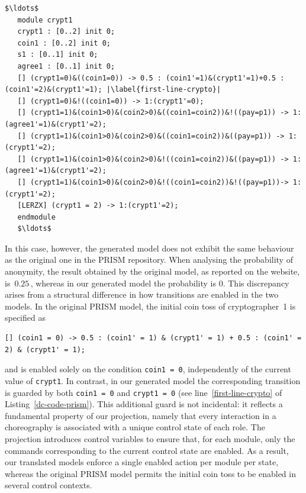 \begin{lstlisting}[style=prism-color,caption={Part of the generated PRISM model for the Dining Cryptographers Protocol},captionpos=b,label={dc-code-prism},escapechar=|]
   $\ldots$
   module crypt1
   crypt1 : [0..2] init 0;
   coin1 : [0..2] init 0;
   s1 : [0..1] init 0;
   agree1 : [0..1] init 0;
   [] (crypt1=0)&((coin1=0)) -> 0.5 : (coin1'=1)&(crypt1'=1)+0.5 : (coin1'=2)&(crypt1'=1); |\label{first-line-crypto}|
   [] (crypt1=0)&!((coin1=0)) -> 1:(crypt1'=0);
   [] (crypt1=1)&(coin1>0)&(coin2>0)&((coin1=coin2))&!((pay=p1)) -> 1:(agree1'=1)&(crypt1'=2);
   [] (crypt1=1)&(coin1>0)&(coin2>0)&((coin1=coin2))&((pay=p1)) -> 1:(crypt1'=2);
   [] (crypt1=1)&(coin1>0)&(coin2>0)&!((coin1=coin2))&((pay=p1)) -> 1:(agree1'=1)&(crypt1'=2);
   [] (crypt1=1)&(coin1>0)&(coin2>0)&!((coin1=coin2))&!((pay=p1))-> 1:(crypt1'=2);
   [LERZX] (crypt1 = 2) -> 1:(crypt1'=2);
   endmodule
   $\ldots$
\end{lstlisting}


In this case, however, the generated model does not exhibit the same behaviour as the
original one in the PRISM repository. When analysing the probability of anonymity, the
result obtained by the original model, as reported on the website, is \(\,0.25\,\), whereas in
our generated model the probability is \(0\). This discrepancy arises from a structural
difference in how transitions are enabled in the two models. In the original PRISM model,
the initial coin toss of cryptographer~1 is specified as
\begin{lstlisting}[style=prism-color, frame=none, numbers=none]
[] (coin1 = 0) -> 0.5 : (coin1' = 1) & (crypt1' = 1) + 0.5 : (coin1' = 2) & (crypt1' = 1);
\end{lstlisting}
and is enabled solely on the condition \texttt{coin1 = 0},
independently of the current value of \texttt{crypt1}. {In contrast,
  in our generated model the corresponding transition is guarded by
  both \texttt{coin1 = 0} and \texttt{crypt1 = 0} (see
  line~\ref{first-line-crypto} of Listing~\ref{dc-code-prism}). This
  additional guard is not incidental: it reflects a fundamental
  property of our projection, namely that every interaction in a
  choreography is associated with a unique control state of each
  role. The projection introduces control variables to ensure that,
  for each module, only the commands corresponding to the current
  control state are enabled. As a result, our translated models
  enforce a single enabled action per module per state, whereas the
  original PRISM model permits the initial coin toss to be enabled in
  several control contexts.}

